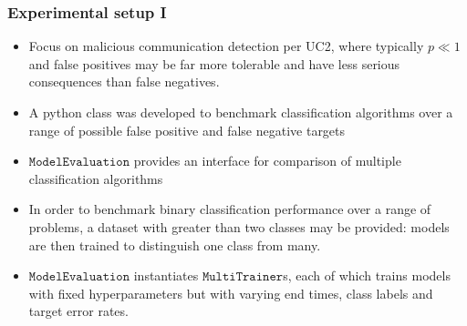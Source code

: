 \documentclass{beamer}
\begin{document}
\begin{frame}
\frametitle{Experimental setup I}
\begin{itemize}
\item
Focus on malicious communication detection per UC2, where typically $p\ll 1$ and false positives may be far more tolerable and have less serious consequences than false negatives.
\item
A python class was developed to benchmark classification algorithms over a range of possible false positive and false negative targets
\item
$\texttt{ModelEvaluation}$ provides an interface for comparison of multiple classification algorithms
\item 
In order to benchmark binary classification performance over a range of problems, a dataset with greater than two classes may be provided: models are then trained to distinguish one class from many.

\item
$\texttt{ModelEvaluation}$ instantiates $\texttt{MultiTrainer}$s, each of which trains models with fixed hyperparameters but with varying end times, class labels and target error rates.
\end{itemize}
\end{frame}
\end{document}
